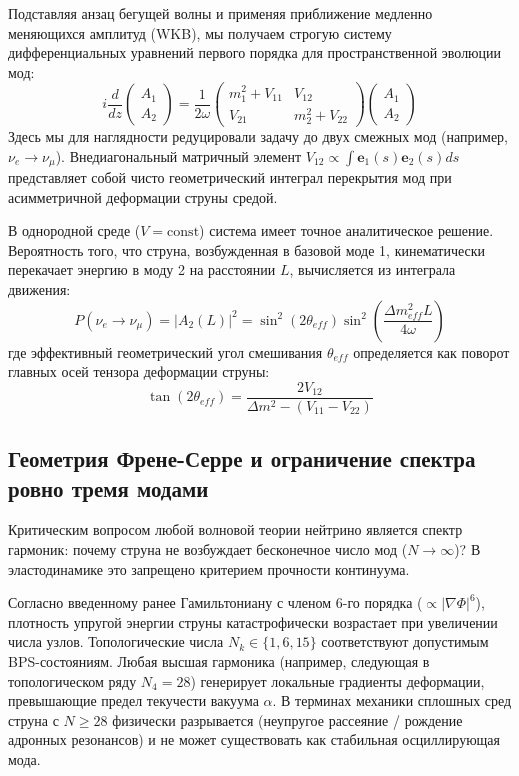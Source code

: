 \documentclass[12pt,a4paper]{article}
\begin{document}
	Подставляя анзац бегущей волны и применяя приближение медленно меняющихся амплитуд (WKB), мы получаем строгую систему дифференциальных уравнений первого порядка для пространственной эволюции мод:
	\begin{equation}
		i \frac{d}{dz} \begin{pmatrix} A_1 \\ A_2 \end{pmatrix} = \frac{1}{2\omega} 
		\begin{pmatrix} 
			m_1^2 + V_{11} & V_{12} \\ 
			V_{21} & m_2^2 + V_{22} 
		\end{pmatrix} 
		\begin{pmatrix} A_1 \\ A_2 \end{pmatrix}
	\end{equation}
	Здесь мы для наглядности редуцировали задачу до двух смежных мод (например, $\nu_e \to \nu_\mu$). Внедиагональный матричный элемент $V_{12} \propto \int \mathbf{e}_1(s) \mathbf{e}_2(s) ds$ представляет собой чисто геометрический интеграл перекрытия мод при асимметричной деформации струны средой.
	
	В однородной среде ($V = \text{const}$) система имеет точное аналитическое решение. Вероятность того, что струна, возбужденная в базовой моде 1, кинематически перекачает энергию в моду 2 на расстоянии $L$, вычисляется из интеграла движения:
	\begin{equation}
		P(\nu_e \to \nu_\mu) = |A_2(L)|^2 = \sin^2(2\theta_{eff}) \sin^2\left( \frac{\Delta m_{eff}^2 L}{4\omega} \right)
	\end{equation}
	где эффективный геометрический угол смешивания $\theta_{eff}$ определяется как поворот главных осей тензора деформации струны:
	\begin{equation}
		\tan(2\theta_{eff}) = \frac{2 V_{12}}{\Delta m^2 - (V_{11} - V_{22})}
	\end{equation}
	
	\subsection{Геометрия Френе-Серре и ограничение спектра ровно тремя модами}
	Критическим вопросом любой волновой теории нейтрино является спектр гармоник: почему струна не возбуждает бесконечное число мод ($N \to \infty$)? В эластодинамике это запрещено критерием прочности континуума.
	
	Согласно введенному ранее Гамильтониану с членом 6-го порядка ($\propto |\nabla \Phi|^6$), плотность упругой энергии струны катастрофически возрастает при увеличении числа узлов. Топологические числа $N_k \in \{1, 6, 15\}$ соответствуют допустимым BPS-состояниям. Любая высшая гармоника (например, следующая в топологическом ряду $N_4 = 28$) генерирует локальные градиенты деформации, превышающие предел текучести вакуума $\alpha$. В терминах механики сплошных сред струна с $N \ge 28$ физически разрывается (неупругое рассеяние / рождение адронных резонансов) и не может существовать как стабильная осциллирующая мода.
	
\end{document}
